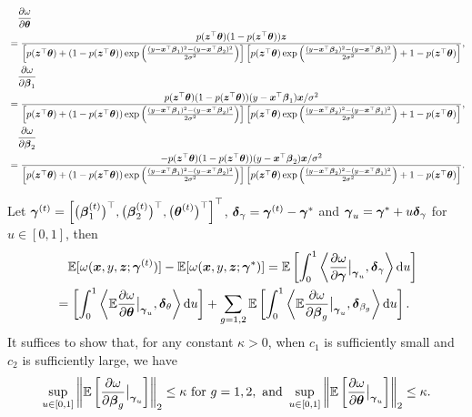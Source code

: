\begin{equation}\label{eq:partial}
	\begin{aligned}
		&\quad \frac{\partial \omega}{\partial \btheta} \\
		& =\frac{p(\bz^\top\btheta)(1-p(\bz^\top\btheta))\bz}{\left[p(\bz^\top\btheta)+(1-p(\bz^\top\btheta))\exp\left(\frac{(y-\bx^{\top}\bbeta_1)^2-(y-\bx^{\top}\bbeta_2)^2}{2\sigma^2}\right)\right]\left[p(\bz^\top\btheta)\exp\left(\frac{(y-\bx^{\top}\bbeta_2)^2-(y-\bx^{\top}\bbeta_1)^2}{2\sigma^2}\right)+1-p(\bz^\top\btheta)\right]}, \\
		&\quad \frac{\partial \omega}{\partial \bbeta_1} \\
		& = \frac{p(\bz^\top\btheta)(1-p(\bz^\top\btheta))(y-\bx^\top\bbeta_1)\bx/\sigma^2}{\left[p(\bz^\top\btheta)+(1-p(\bz^\top\btheta))\exp\left(\frac{(y-\bx^{\top}\bbeta_1)^2-(y-\bx^{\top}\bbeta_2)^2}{2\sigma^2}\right)\right]\left[p(\bz^\top\btheta)\exp\left(\frac{(y-\bx^{\top}\bbeta_2)^2-(y-\bx^{\top}\bbeta_1)^2}{2\sigma^2}\right)+1-p(\bz^\top\btheta)\right]},\\
		&\quad \frac{\partial \omega}{\partial \bbeta_2} \\
		& = \frac{-p(\bz^\top\btheta)(1-p(\bz^\top\btheta))(y-\bx^\top\bbeta_2)\bx/\sigma^2}{\left[p(\bz^\top\btheta)+(1-p(\bz^\top\btheta))\exp\left(\frac{(y-\bx^{\top}\bbeta_1)^2-(y-\bx^{\top}\bbeta_2)^2}{2\sigma^2}\right)\right]\left[p(\bz^\top\btheta)\exp\left(\frac{(y-\bx^{\top}\bbeta_2)^2-(y-\bx^{\top}\bbeta_1)^2}{2\sigma^2}\right)+1-p(\bz^\top\btheta)\right]}.
	\end{aligned}
\end{equation}

Let $\bgamma^{(t)}=\left[\big(\bbeta_1^{(t)}\big)^{\top}, \big(\bbeta_2^{(t)}\big)^{\top}, \big(\btheta^{(t)}\big)^{\top}\right]^\top$, $\bdelta_\gamma=\bgamma^{(t)}-\bgamma^*$ and $\bgamma_u=\bgamma^*+u\bdelta_\gamma$ for $u\in[0,1]$, then
\begin{align*}
& \quad \EE[\omega(\bx, y, \bz ; \bgamma^{(t)})  ] - \EE[\omega(\bx, y, \bz ; \bgamma^*) ] = \EE\brackets{\int_0^1\angles{\frac{\partial\omega}{\partial \bgamma} \big|_{\bgamma_u}, \bdelta_\gamma} \mathrm{d} u} \\
& = \brackets{\int_0^1\angles{\EE\frac{\partial\omega}{\partial \btheta}\big|_{\bgamma_u}, \bdelta_\theta} \mathrm{d} u} + \sum_{g=1,2}\EE\brackets{\int_0^1\angles{\EE\frac{\partial\omega}{\partial \bbeta_{g}}\big|_{\bgamma_{u}}, \bdelta_{\beta_g}} \mathrm{d} u}.
\end{align*}
It suffices to show that, for any constant $\kappa>0$, when $c_1$ is sufficiently small and $c_2$ is sufficiently large, we have
\begin{equation}\label{eq:partial-bound}
	\sup_{u \in [0, 1]}\norm{\EE\left[\frac{\partial\omega}{\partial \bbeta_g}\big|_{\bgamma_{u}}\right]}_2 \leq \kappa \text{ for } g=1, 2, \text{ and } \sup_{u \in [0, 1]}\norm{\EE\left[\frac{\partial\omega}{\partial \btheta}\big|_{\bgamma_{u}}\right]}_2 \leq \kappa.
\end{equation}

